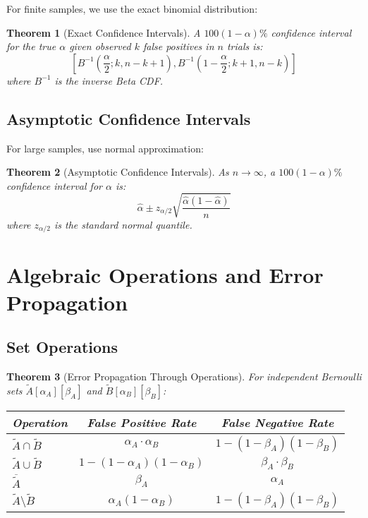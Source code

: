 \documentclass[11pt,final,hidelinks]{article}
\newtheorem{theorem}{Theorem}[section]
\newcommand{\obs}[1]{\widetilde{#1}}
\newcommand{\fprate}{\alpha}
\newcommand{\fnrate}{\beta}
\newcommand{\SetComplement}[1]{\overline{#1}}
\begin{document}
For finite samples, we use the exact binomial distribution:

\begin{theorem}[Exact Confidence Intervals]
A $100(1-\alpha)\%$ confidence interval for the true $\fprate$ given observed $k$ false positives in $n$ trials is:
\begin{equation}
\left[B^{-1}\left(\frac{\alpha}{2}; k, n-k+1\right), B^{-1}\left(1-\frac{\alpha}{2}; k+1, n-k\right)\right]
\end{equation}
where $B^{-1}$ is the inverse Beta CDF.
\end{theorem}

\subsection{Asymptotic Confidence Intervals}

For large samples, use normal approximation:

\begin{theorem}[Asymptotic Confidence Intervals]
As $n \to \infty$, a $100(1-\alpha)\%$ confidence interval for $\fprate$ is:
\begin{equation}
\hat{\fprate} \pm z_{\alpha/2}\sqrt{\frac{\hat{\fprate}(1-\hat{\fprate})}{n}}
\end{equation}
where $z_{\alpha/2}$ is the standard normal quantile.
\end{theorem}

\section{Algebraic Operations and Error Propagation}

\subsection{Set Operations}

\begin{theorem}[Error Propagation Through Operations]
For independent Bernoulli sets $\obs{A}[\fprate_A][\fnrate_A]$ and $\obs{B}[\fprate_B][\fnrate_B]$:

\begin{center}
\begin{tabular}{lcc}
\toprule
Operation & False Positive Rate & False Negative Rate \\
\midrule
$\obs{A} \cap \obs{B}$ & $\fprate_A \cdot \fprate_B$ & $1-(1-\fnrate_A)(1-\fnrate_B)$ \\
$\obs{A} \cup \obs{B}$ & $1-(1-\fprate_A)(1-\fprate_B)$ & $\fnrate_A \cdot \fnrate_B$ \\
$\SetComplement{\obs{A}}$ & $\fnrate_A$ & $\fprate_A$ \\
$\obs{A} \setminus \obs{B}$ & $\fprate_A(1-\fprate_B)$ & $1-(1-\fnrate_A)(1-\fnrate_B)$ \\
\bottomrule
\end{tabular}
\end{center}
\end{theorem}
\end{document}
